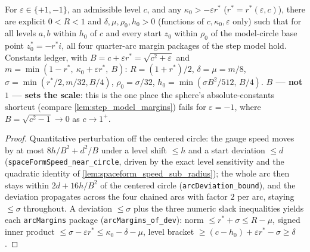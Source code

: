 \begin{lemma}
  \label{lem:spaceform_step_model_margins}
  For $\varepsilon\in\{+1,-1\}$, an admissible level $c$, and any
  $\kappa_0>-\varepsilon r^\ast$ ($r^\ast=r^\ast(\varepsilon,c)$), there are
  explicit $0<R<1$ and $\delta,\mu,\rho_0,h_0>0$ (functions of
  $c,\kappa_0,\varepsilon$ only) such that for all levels $a,b$ within $h_0$
  of $c$ and every start $z_0$ within $\rho_0$ of the model-circle base point
  $z_0^\ast=-r^\ast i$, all four quarter-arc margin packages of the step
  model hold. Constants ledger, with $B=c+\varepsilon
  r^\ast=\sqrt{c^2+\varepsilon}$ and
  $m=\min(1-r^\ast,\ \kappa_0+\varepsilon r^\ast,\ B)$: $R=(1+r^\ast)/2$,
  $\delta=\mu=m/8$, $\sigma=\min(r^\ast/2,m/32,B/4)$, $\rho_0=\sigma/32$,
  $h_0=\min(\sigma B^2/512,\,B/4)$. \textbf{$B$ — not $1$ — sets the
  scale}: this is the one place the sphere's absolute-constants shortcut
  (compare \cref{lem:step_model_margins}) fails for $\varepsilon=-1$, where
  $B=\sqrt{c^2-1}\to0$ as $c\to1^{+}$.
\end{lemma}

\begin{proof}
  \leanok
  Quantitative perturbation off the centered circle: the gauge speed moves by
  at most $8h/B^2+d^2/B$ under a level shift $\le h$ and a start deviation
  $\le d$ (\texttt{spaceFormSpeed\_near\_circle}, driven by the exact level
  sensitivity and the quadratic identity of
  \cref{lem:spaceform_speed_sub_radius}); the whole arc then stays within
  $2d+16h/B^2$ of the centered circle (\texttt{arcDeviation\_bound}), and the
  deviation propagates across the four chained arcs with factor $2$ per arc,
  staying $\le\sigma$ throughout. A deviation $\le\sigma$ plus the three
  numeric slack inequalities yields each \texttt{arcMargins} package
  (\texttt{arcMargins\_of\_dev}): norm $\le r^\ast+\sigma\le R-\mu$, signed
  inner product $\le\sigma-\varepsilon r^\ast\le\kappa_0-\delta-\mu$, level
  bracket $\ge(c-h_0)+\varepsilon r^\ast-\sigma\ge\delta$.
\end{proof}

